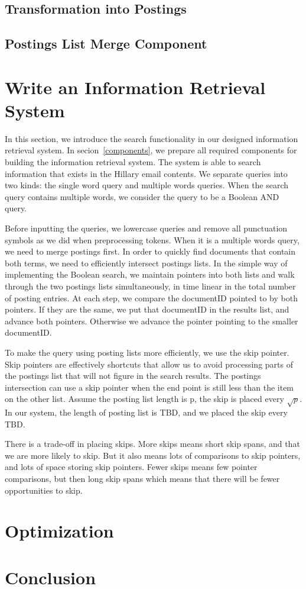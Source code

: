 \documentclass[journal]{IEEEtran}
\begin{document}
\subsection{Transformation into Postings}

\subsection{Postings List Merge Component}

\section{Write an Information Retrieval System}\label{system}
In this section, we introduce the search functionality in our designed information retrieval system. In secion~\ref{components}, we prepare all required components for building the information retrieval system. The system is able to search information that exists in the Hillary email contents. We separate queries into two kinds: the single word query and multiple words queries. When the search query contains multiple words, we consider the query to be a Boolean AND query.

Before inputting the queries, we lowercase queries and remove all punctuation symbols as we did when preprocessing tokens. When it is a multiple words query, we need to merge postings first. In order to quickly find documents that contain both terms, we need to efficiently intersect postings lists. In the simple way of implementing the Boolean search, we maintain pointers into both lists and walk through the two postings lists simultaneously, in time linear in the total number of posting entries. At each step, we compare the documentID pointed to by both pointers. If they are the same, we put that documentID in the results list, and advance both pointers. Otherwise we advance the pointer pointing to the smaller documentID. 

To make the query using posting lists more efficiently, we use the skip pointer. Skip pointers are effectively shortcuts that allow us to avoid processing parts of the postings list that will not figure in the search results. The postings intersection can use a skip pointer when the end point is still less than the item on the other list. Assume the posting list length is p, the skip is placed every $\sqrt{p}$. In our system, the length of posting list is TBD, and we placed the skip every TBD. 

There is a trade-off in placing skips. More skips means short skip spans, and that we are more likely to skip. But it also means lots of comparisons to skip pointers, and lots of space storing skip pointers. Fewer skips means few pointer comparisons, but then long skip spans which means that there will be fewer opportunities to skip.

\section{Optimization}\label{optimization}


\section{Conclusion}





{}


\end{document}
